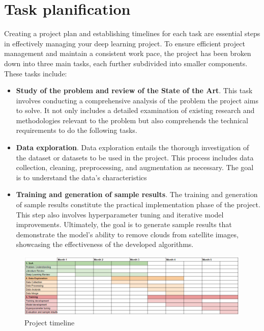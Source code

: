 \documentclass[11pt, a4paper]{article}
\begin{document}
	\section*{Task planification}
	Creating a project plan and establishing timelines for each task are essential steps in effectively managing your deep learning project. To ensure efficient project management and maintain a consistent work pace, the project has been broken down into three main tasks, each further subdivided into smaller components. These tasks include:
	\begin{itemize}
	\item \textbf{Study of the problem and review of the State of the Art}. This task involves conducting a comprehensive analysis of the problem the project aims to solve. It not only includes a detailed examination of existing research and methodologies relevant to the problem but also comprehends the technical requirements to do the following tasks.
	\item \textbf{Data exploration}. Data exploration entails the thorough investigation of the dataset or datasets to be used in the project. This process includes data collection, cleaning, preprocessing, and augmentation as necessary. The goal is to understand the data's characteristics
	\item \textbf{Training and generation of sample results}. The training and generation of sample results constitute the practical implementation phase of the project. This step also involves hyperparameter tuning and iterative model improvements. Ultimately, the goal is to generate sample results that demonstrate the model's ability to remove clouds from satellite images, showcasing the effectiveness of the developed algorithms.
	\end{itemize}
	\begin{figure}[H]
		\caption{Project timeline}
		\centering
			\begin{adjustwidth}{-2cm}{}
		\includegraphics[width=18cm]{imgs/gantt.png}
		\end{adjustwidth}
	\end{figure}
	\newpage
\end{document}
